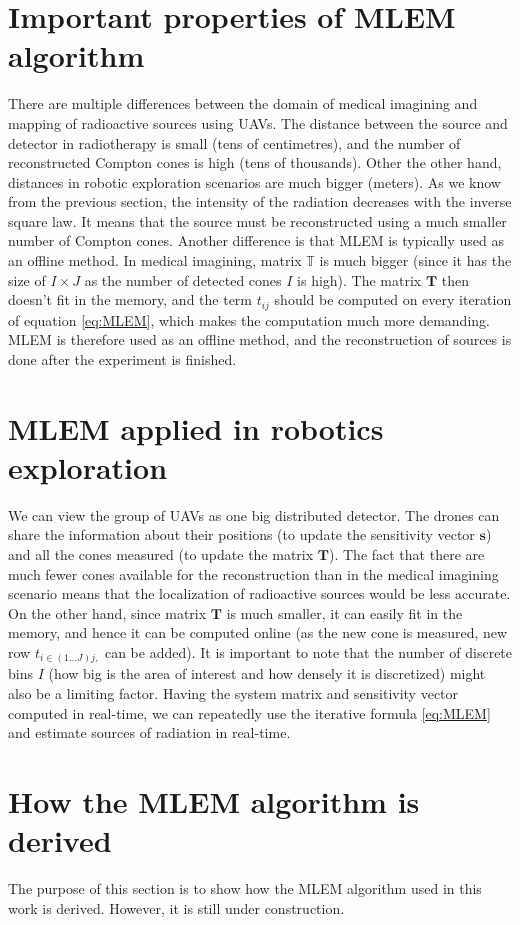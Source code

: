 \section{Important properties of MLEM algorithm}
There are multiple differences between the domain of medical imagining and mapping of radioactive sources using \ac{UAV}s.
The distance between the source and detector in radiotherapy is small (tens of centimetres), and the number of reconstructed Compton cones is high (tens of thousands).
Other the other hand, distances in robotic exploration scenarios are much bigger (meters). 
As we know from the previous section, the intensity of the radiation decreases with the inverse square law.
It means that the source must be reconstructed using a much smaller number of Compton cones.
Another difference is that \ac{MLEM} is typically used as an offline method.
In medical imagining, matrix $\mathbb{T}$ is much bigger (since it has the size of $I \times J$ as the number of detected cones $I$ is high).
The matrix $\mathbf{T}$ then doesn't fit in the memory, and the term $t_{ij}$ should be computed on every iteration of equation \ref{eq:MLEM}, which makes the computation much more demanding.
\ac{MLEM} is therefore used as an offline method, and the reconstruction of sources is done after the experiment is finished.

\section{MLEM applied in robotics exploration}
We can view the group of \ac{UAV}s as one big distributed detector.
The drones can share the information about their positions (to update the sensitivity vector $\mathbf{s}$) and all the cones measured (to update the matrix $\mathbf{T}$).
The fact that there are much fewer cones available for the reconstruction than in the medical imagining scenario means that the localization of radioactive sources would be less accurate. 
On the other hand, since matrix $\mathbf{T}$ is much smaller, it can easily fit in the memory, and hence it can be computed online (as the new cone is measured, new row $t_{i\in(1 \dotsc J) j,}$ can be added). 
It is important to note that the number of discrete bins $I$ (how big is the area of interest and how densely it is discretized) might also be a limiting factor.
Having the system matrix and sensitivity vector computed in real-time, we can repeatedly use the iterative formula \ref{eq:MLEM} and estimate sources of radiation in real-time.

\section{How the MLEM algorithm is derived}
The purpose of this section is to show how the MLEM algorithm used in this work is derived.
However, it is still under construction.
